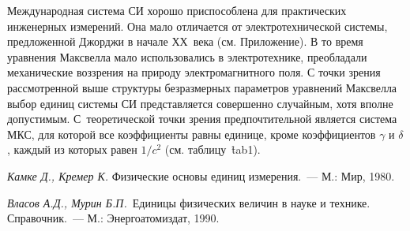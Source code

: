 
Международная система СИ хорошо приспособлена для практических инженерных измерений. Она мало отличается от
электротехнической системы, предложенной Джорджи в начале ХХ~века (см. Приложение). В то время уравнения Максвелла мало
использовались в электротехнике, преобладали механические воззрения на природу электромагнитного поля. С точки зрения
рассмотренной выше структуры безразмерных параметров уравнений Максвелла выбор единиц системы СИ представляется
совершенно случайным, хотя вполне допустимым. С~теоретической точки зрения предпочтительной является система МКС, для
которой все коэффициенты равны единице, кроме коэффициентов $\gamma$ и  $\delta$, каждый из которых равен $1/c^2$ (см.
таблицу~\r{tab1}).

{\small

\lit

\n \emph{Камке Д., Кремер К.} Физические основы единиц измерения.~--- М.: Мир, 1980.

\n \emph{Власов А.Д., Мурин Б.П.}~Единицы физических величин в науке и технике. Справочник.~--- М.: Энергоатомиздат,
1990.

}
